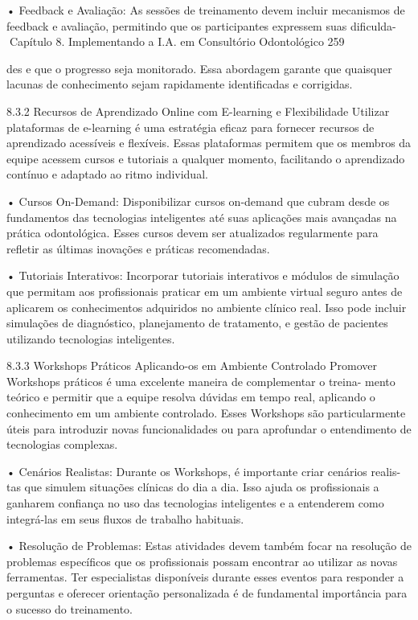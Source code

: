     • Feedback e Avaliação: As sessões de treinamento devem incluir mecanismos de
      feedback e avaliação, permitindo que os participantes expressem suas dificulda-
Capítulo 8. Implementando a I.A. em Consultório Odontológico                       259


      des e que o progresso seja monitorado. Essa abordagem garante que quaisquer
      lacunas de conhecimento sejam rapidamente identificadas e corrigidas.

8.3.2    Recursos de Aprendizado Online com E-learning e Flexibilidade
Utilizar plataformas de e-learning é uma estratégia eficaz para fornecer recursos de
aprendizado acessíveis e flexíveis. Essas plataformas permitem que os membros
da equipe acessem cursos e tutoriais a qualquer momento, facilitando o aprendizado
contínuo e adaptado ao ritmo individual.

    • Cursos On-Demand: Disponibilizar cursos on-demand que cubram desde os
      fundamentos das tecnologias inteligentes até suas aplicações mais avançadas
      na prática odontológica. Esses cursos devem ser atualizados regularmente para
      refletir as últimas inovações e práticas recomendadas.

    • Tutoriais Interativos: Incorporar tutoriais interativos e módulos de simulação
      que permitam aos profissionais praticar em um ambiente virtual seguro antes de
      aplicarem os conhecimentos adquiridos no ambiente clínico real. Isso pode incluir
      simulações de diagnóstico, planejamento de tratamento, e gestão de pacientes
      utilizando tecnologias inteligentes.

8.3.3    Workshops Práticos Aplicando-os em Ambiente Controlado
Promover Workshops práticos é uma excelente maneira de complementar o treina-
mento teórico e permitir que a equipe resolva dúvidas em tempo real, aplicando o
conhecimento em um ambiente controlado. Esses Workshops são particularmente
úteis para introduzir novas funcionalidades ou para aprofundar o entendimento de
tecnologias complexas.

    • Cenários Realistas: Durante os Workshops, é importante criar cenários realis-
      tas que simulem situações clínicas do dia a dia. Isso ajuda os profissionais a
      ganharem confiança no uso das tecnologias inteligentes e a entenderem como
      integrá-las em seus fluxos de trabalho habituais.

    • Resolução de Problemas: Estas atividades devem também focar na resolução
      de problemas específicos que os profissionais possam encontrar ao utilizar as
      novas ferramentas. Ter especialistas disponíveis durante esses eventos para
      responder a perguntas e oferecer orientação personalizada é de fundamental
      importância para o sucesso do treinamento.

